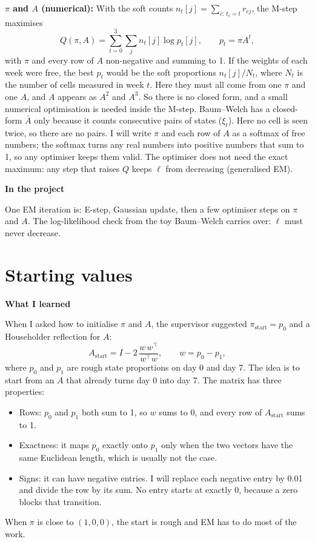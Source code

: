 \documentclass[10pt,a4paper]{article}
\newcommand{\sub}[1]{\vspace{1pt}\textbf{\textcolor{gray!80!black}{#1}}\par}
\begin{document}
\textbf{$\pi$ and $A$ (numerical):} With the soft counts $n_t[j] = \sum_{c:\, t_c = t} r_{cj}$, the M-step maximises
\[
Q(\pi, A) = \sum_{t=0}^{3} \sum_{j} n_t[j] \log p_t[j], \qquad p_t = \pi A^t,
\]
with $\pi$ and every row of $A$ non-negative and summing to 1. If the weights of each week were free, the best $p_t$ would be the soft proportions $n_t[j]/N_t$, where $N_t$ is the number of cells measured in week $t$. Here they must all come from one $\pi$ and one $A$, and $A$ appears as $A^2$ and $A^3$. So there is no closed form, and a small numerical optimisation is needed inside the M-step. Baum--Welch has a closed-form $\bar{A}$ only because it counts consecutive pairs of states ($\xi_t$). Here no cell is seen twice, so there are no pairs. I will write $\pi$ and each row of $A$ as a softmax of free numbers; the softmax turns any real numbers into positive numbers that sum to 1, so any optimiser keeps them valid. The optimiser does not need the exact maximum: any step that raises $Q$ keeps $\ell$ from decreasing (generalised EM).

\sub{In the project}
One EM iteration is: E-step, Gaussian update, then a few optimiser steps on $\pi$ and $A$. The log-likelihood check from the toy Baum--Welch carries over: $\ell$ must never decrease.

\section{Starting values}

\sub{What I learned}
When I asked how to initialise $\pi$ and $A$, the supervisor suggested $\pi_{\text{start}} = p_0$ and a Householder reflection for $A$:
\[
A_{\text{start}} = I - 2\,\frac{w\, w^\top}{w^\top w}, \qquad w = p_0 - p_1 ,
\]
where $p_0$ and $p_1$ are rough state proportions on day 0 and day 7. The idea is to start from an $A$ that already turns day 0 into day 7. The matrix has three properties:
\begin{itemize}
  \item Rows: $p_0$ and $p_1$ both sum to 1, so $w$ sums to 0, and every row of $A_{\text{start}}$ sums to 1.
  \item Exactness: it maps $p_0$ exactly onto $p_1$ only when the two vectors have the same Euclidean length, which is usually not the case.
  \item Signs: it can have negative entries. I will replace each negative entry by 0.01 and divide the row by its sum. No entry starts at exactly 0, because a zero blocks that transition.
\end{itemize}
When $\pi$ is close to $(1,0,0)$, the start is rough and EM has to do most of the work.
\end{document}

